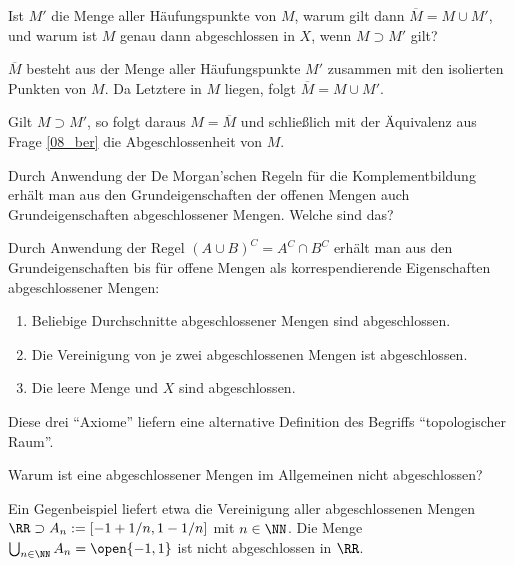 \begin{frage}\label{08_haufab}
  Ist $M'$ die Menge aller Häufungspunkte von $M$, warum gilt dann 
  $\overline{M} = M \cup M'$, 
  und warum ist $M$ genau dann abgeschlossen in $X$, wenn $M\supset M'$ gilt?
\end{frage}

\begin{antwort}
  
  $\overline{M}$ besteht aus der Menge aller Häufungspunkte $M'$ 
  zusammen mit den isolierten Punkten von $M$. Da Letztere in 
  $M$ liegen, folgt $\overline{M} = M \cup M'$. 

  Gilt $M\supset M'$, so folgt daraus $M=\overline{M}$ und schließlich 
  mit der Äquivalenz aus Frage \ref{08_ber} die Abgeschlossenheit von $M$. 
  \AntEnd
\end{antwort}

\begin{frage} 
  Durch Anwendung der De Morgan'schen Regeln für die Komplementbildung 
  erhält man aus den Grundeigenschaften der offenen Mengen auch 
  Grundeigenschaften abgeschlossener Mengen. Welche sind das?
\end{frage} 

\begin{antwort}
  Durch Anwendung der Regel $(A \cup B)^C = A^C \cap B^C$ 
  erhält man aus den Grundeigenschaften  bis  für offene 
  Mengen als korrespendierende Eigenschaften abgeschlossener Mengen:
  {\setlength{\labelsep}{9mm}
    \begin{enumerate}
    \item[\desc{TA1}] Beliebige Durchschnitte abgeschlossener Mengen sind abgeschlossen.
    \item[\desc{TA2}] Die Vereinigung von je zwei abgeschlossenen 
      Mengen ist abgeschlossen.
    \item[\desc{TA3}] Die leere Menge und $X$ sind abgeschlossen.
    \end{enumerate}}
  Diese drei "`Axiome"' liefern eine alternative Definition des 
  Begriffs "`topologischer Raum"'.
  \AntEnd 
\end{antwort}

\begin{frage}
  Warum ist eine  abgeschlossener Mengen 
  im Allgemeinen nicht abgeschlossen?
\end{frage}

\begin{antwort}
  Ein Gegenbeispiel liefert etwa die Vereinigung 
  aller abgeschlossenen Mengen 
  $\RR \supset A_n := [ -1+1/n, 1-1/n ]$ mit $n\in \NN$. Die Menge  
  $\bigcup_{n\in\NN} A_n = \open{-1,1}$ ist nicht abgeschlossen in $\RR$.
  \AntEnd
\end{antwort}

